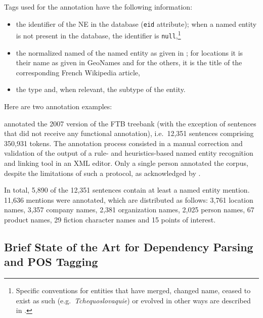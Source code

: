 Tags used for the annotation have the following information:
\begin{itemize}
    \item the identifier of the NE in the \aleda database (\texttt{eid} attribute); when a named entity is not present in the database, the identifier is \texttt{null},\footnote{Specific conventions for entities that have merged, changed name, ceased to exist as such (e.g.~\emph{Tchequoslovaquie}) or evolved in other ways are described in \citet{sagot-etal-2012-annotation}.}
    \item the normalized named of the named entity as given in \aleda; for locations it is their name as given in GeoNames and for the others, it is the title of the corresponding French Wikipedia article,
    \item the type and, when relevant, the subtype of the entity.
\end{itemize}
Here are two annotation examples:\\

\citet{sagot-etal-2012-annotation} annotated the 2007 version of the FTB treebank (with the exception of sentences that did not receive any functional annotation), i.e.~12,351 sentences comprising 350,931 tokens. The annotation process consisted in a manual correction and validation of the output of a rule- and heuristics-based named entity recognition and linking tool in an XML editor.
Only a single person annotated the corpus, despite the limitations of such a protocol, as acknowledged by \citet{sagot-etal-2012-annotation}.

In total, 5,890 of the 12,351 sentences contain at least a named entity mention. 11,636 mentions were annotated, which are distributed as follows: 3,761 location names, 3,357 company names, 2,381 organization names, 2,025 person names, 67 product names, 29 fiction character names and 15 points of interest.

\subsection{Brief State of the Art for Dependency Parsing and POS Tagging}

